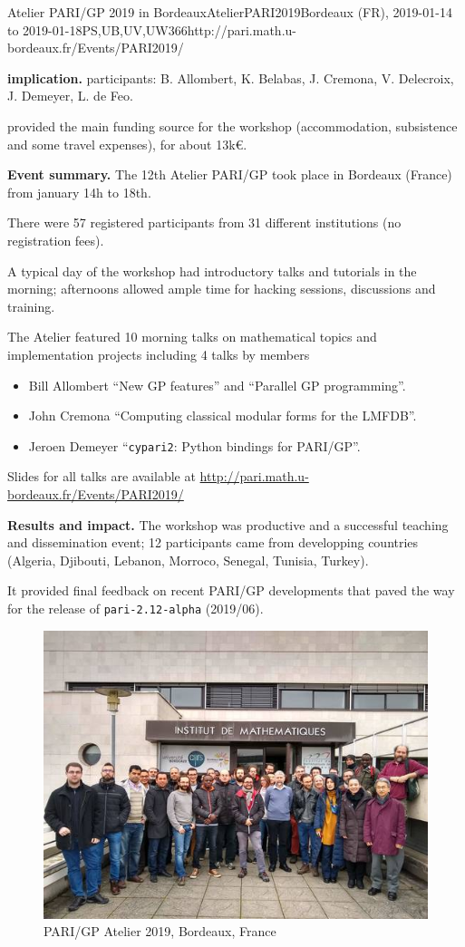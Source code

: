 \begin{event}{ Atelier PARI/GP 2019 in Bordeaux}{AtelierPARI2019}{Bordeaux (FR),
2019-01-14 to 2019-01-18}{PS,UB,UV,UW}{36}{6}{http://pari.math.u-bordeaux.fr/Events/PARI2019/}


\textbf{\ODK implication.} \ODK participants: B. Allombert, K. Belabas, J.
Cremona, V. Delecroix, J.  Demeyer, L. de Feo.

\ODK provided the main funding source for the workshop (accommodation,
subsistence and some travel expenses), for about 13k\euro.

\textbf{Event summary.} The 12th Atelier PARI/GP took place in Bordeaux
(France) from january 14h to 18th.

There were 57 registered participants from 31 different institutions
(no registration fees).

A typical day of the workshop had introductory talks and tutorials
in the morning; afternoons allowed ample time for hacking sessions,
discussions and training.

The Atelier featured 10 morning talks on mathematical topics and
implementation projects including 4 talks by \ODK members
\begin{itemize}
\item Bill Allombert ``New GP features'' and ``Parallel GP programming''.
\item John Cremona ``Computing classical modular forms for the LMFDB''.
\item Jeroen Demeyer ``\texttt{cypari2}: Python bindings for PARI/GP''.
\end{itemize}

Slides for all talks are available at
\url{http://pari.math.u-bordeaux.fr/Events/PARI2019/}

\textbf{Results and impact.} The workshop was productive and a successful
teaching and dissemination event; 12 participants came from developping
countries (Algeria, Djibouti, Lebanon, Morroco, Senegal, Tunisia,
Turkey).

It provided final feedback on recent PARI/GP developments that paved the way
for the release of \texttt{pari-2.12-alpha} (2019/06).

\begin{figure}[ht]
  \includegraphics[width=.75\textwidth]{pari2019.jpg}
  \caption*{PARI/GP Atelier 2019, Bordeaux, France}
\end{figure}

\end{event}
